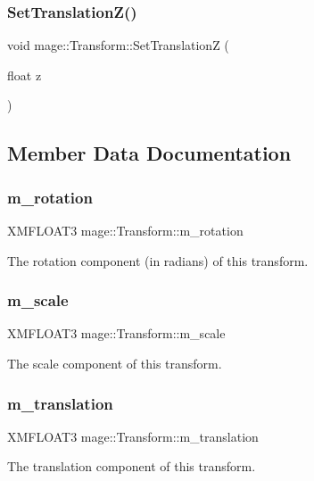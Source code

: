 \subsubsection{\texorpdfstring{Set\+Translation\+Z()}{SetTranslationZ()}}
{\footnotesize\ttfamily void mage\+::\+Transform\+::\+Set\+TranslationZ (\begin{DoxyParamCaption}\item[{float}]{z }\end{DoxyParamCaption})}



\subsection{Member Data Documentation}
\hypertarget{structmage_1_1_transform_a037b4fb338bfe79aa2ab1a2e809c40df}{}\label{structmage_1_1_transform_a037b4fb338bfe79aa2ab1a2e809c40df} 
\subsubsection{\texorpdfstring{m\+\_\+rotation}{m\_rotation}}
{\footnotesize\ttfamily X\+M\+F\+L\+O\+A\+T3 mage\+::\+Transform\+::m\+\_\+rotation\hspace{0.3cm}{\ttfamily [protected]}}

The rotation component (in radians) of this transform. \hypertarget{structmage_1_1_transform_a25d15c85b93037bab5b755c86bef0b54}{}\label{structmage_1_1_transform_a25d15c85b93037bab5b755c86bef0b54} 
\subsubsection{\texorpdfstring{m\+\_\+scale}{m\_scale}}
{\footnotesize\ttfamily X\+M\+F\+L\+O\+A\+T3 mage\+::\+Transform\+::m\+\_\+scale\hspace{0.3cm}{\ttfamily [protected]}}

The scale component of this transform. \hypertarget{structmage_1_1_transform_a57e27b28e0cf85be034055a68513ad79}{}\label{structmage_1_1_transform_a57e27b28e0cf85be034055a68513ad79} 
\subsubsection{\texorpdfstring{m\+\_\+translation}{m\_translation}}
{\footnotesize\ttfamily X\+M\+F\+L\+O\+A\+T3 mage\+::\+Transform\+::m\+\_\+translation\hspace{0.3cm}{\ttfamily [protected]}}

The translation component of this transform. 